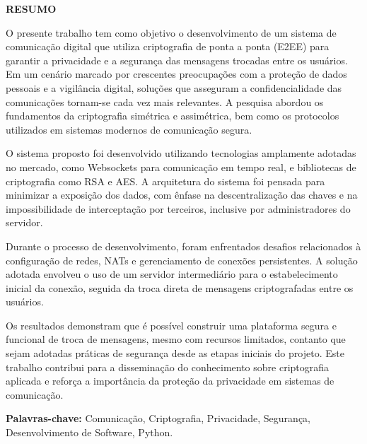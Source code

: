 \begin{center}
  \large\textbf{RESUMO}
\end{center}

O presente trabalho tem como objetivo o desenvolvimento de um sistema
de comunicação digital que utiliza criptografia de ponta a ponta
(\acs{E2EE}) para garantir a privacidade e a segurança das mensagens
trocadas entre os usuários. Em um cenário marcado por crescentes
preocupações com a proteção de dados pessoais e a vigilância digital,
soluções que asseguram a confidencialidade das comunicações tornam-se
cada vez mais relevantes. A pesquisa abordou os fundamentos da
criptografia simétrica e assimétrica, bem como os protocolos
utilizados em sistemas modernos de comunicação segura.

O sistema proposto foi desenvolvido utilizando tecnologias amplamente
adotadas no mercado, como Websockets para comunicação em tempo real,
e bibliotecas de criptografia como \acs{RSA} e \acs{AES}. A arquitetura do
sistema foi pensada para minimizar a exposição dos dados, com ênfase
na descentralização das chaves e na impossibilidade de interceptação
por terceiros, inclusive por administradores do servidor.

Durante o processo de desenvolvimento, foram enfrentados desafios
relacionados à configuração de redes, \acsp{NAT} e gerenciamento de
conexões persistentes. A solução adotada envolveu o uso de um
servidor intermediário para o estabelecimento inicial da conexão,
seguida da troca direta de mensagens criptografadas entre os usuários.

Os resultados demonstram que é possível construir uma plataforma
segura e funcional de troca de mensagens, mesmo com recursos
limitados, contanto que sejam adotadas práticas de segurança desde as
etapas iniciais do projeto. Este trabalho contribui para a
disseminação do conhecimento sobre criptografia aplicada e reforça a
importância da proteção da privacidade em sistemas de comunicação.

\vspace{0.7cm}

{\setlength{\parindent}{0cm}
  \textbf{Palavras-chave:} Comunicação, Criptografia, Privacidade,
  Segurança, Desenvolvimento de Software, Python.
}

\thispagestyle{empty}
\newpage
